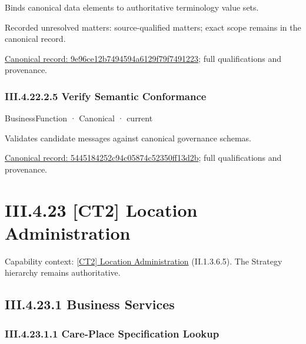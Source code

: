Binds canonical data elements to authoritative terminology value sets.


{\small Recorded unresolved matters: source-qualified matters; exact scope remains in the canonical record.}\par
{\footnotesize \href{../../../../continuum/business/business-function/9e96ce12b7494594a6129f79f7491223.md}{Canonical record: 9e96ce12b7494594a6129f79f7491223}; full qualifications and provenance.}\par
\subsubsection*{III.4.22.2.5 Verify Semantic Conformance}
\label{navigation:III.4.22.2.5}

\label{element:5445184252c94c05874c52350ff13d2b}
{\small BusinessFunction · Canonical · current}\par

Validates candidate messages against canonical governance schemas.


{\footnotesize \href{../../../../continuum/business/business-function/5445184252c94c05874c52350ff13d2b.md}{Canonical record: 5445184252c94c05874c52350ff13d2b}; full qualifications and provenance.}\par
\section*{III.4.23 [CT2] Location Administration}
\label{navigation:III.4.23}

{\small Capability context: \hyperref[element:c410005667444f99a221483bf577fad2]{[CT2] Location Administration} (II.1.3.6.5). The Strategy hierarchy remains authoritative.}\par
\subsection*{III.4.23.1 Business Services}
\label{navigation:III.4.23.1}

\subsubsection*{III.4.23.1.1 Care-Place Specification Lookup}
\label{navigation:III.4.23.1.1}

